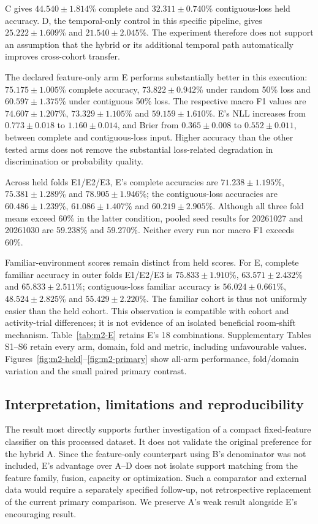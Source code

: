 C gives $44.540\pm1.814$\% complete and $32.311\pm0.740$\% contiguous-loss
held accuracy. D, the temporal-only control in this specific pipeline,
gives $25.222\pm1.609$\% and $21.540\pm2.045$\%. The experiment therefore
does not support an assumption that the hybrid or its additional temporal
path automatically improves cross-cohort transfer.

The declared feature-only arm E performs substantially better in this
execution: $75.175\pm1.005$\% complete accuracy,
$73.822\pm0.942$\% under random 50\% loss and
$60.597\pm1.375$\% under contiguous 50\% loss.
The respective macro F1 values are $74.607\pm1.207$\%,
$73.329\pm1.105$\% and $59.159\pm1.610$\%.
E's NLL increases from $0.773\pm0.018$ to $1.160\pm0.014$, and Brier
from $0.365\pm0.008$ to $0.552\pm0.011$, between complete and contiguous-loss
input. Higher accuracy than the other tested arms does not remove the
substantial loss-related degradation in discrimination or probability quality.

Across held folds E1/E2/E3, E's complete accuracies are
$71.238\pm1.195$\%, $75.381\pm1.289$\% and $78.905\pm1.946$\%;
the contiguous-loss accuracies are $60.486\pm1.239$\%,
$61.086\pm1.407$\% and $60.219\pm2.905$\%.
Although all three fold means exceed 60\% in the latter condition, pooled
seed results for 20261027 and 20261030 are 59.238\% and 59.270\%.
Neither every run nor macro F1 exceeds 60\%.

Familiar-environment scores remain distinct from held scores.
For E, complete familiar accuracy in outer folds E1/E2/E3 is
$75.833\pm1.910$\%, $63.571\pm2.432$\% and $65.833\pm2.511$\%;
contiguous-loss familiar accuracy is $56.024\pm0.661$\%,
$48.524\pm2.825$\% and $55.429\pm2.220$\%.
The familiar cohort is thus not uniformly easier than the held cohort.
This observation is compatible with cohort and activity-trial differences;
it is not evidence of an isolated beneficial room-shift mechanism.
Table~\ref{tab:m2-E} retains E's 18 combinations. Supplementary Tables S1--S6
retain every arm, domain, fold and metric, including unfavourable values.
Figures~\ref{fig:m2-held}--\ref{fig:m2-primary} show all-arm performance,
fold/domain variation and the small paired primary contrast.





\subsection*{Interpretation, limitations and reproducibility}
The result most directly supports further investigation of a compact
fixed-feature classifier on this processed dataset. It does not validate
the original preference for the hybrid A. Since the feature-only counterpart
using B's denominator was not included, E's advantage over A--D does not
isolate support matching from the feature family, fusion, capacity or
optimization. Such a comparator and external data would require a separately
specified follow-up, not retrospective replacement of the current primary
comparison. We preserve A's weak result alongside E's encouraging result.

